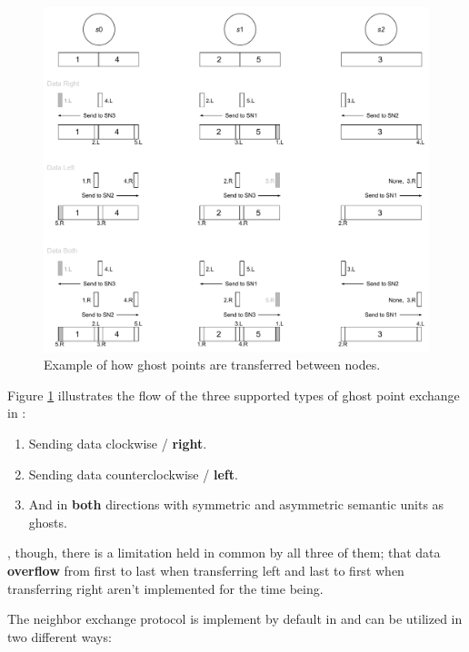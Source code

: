\begin{figure}[ht!]
\centering
\vspace*{6mm}
\includegraphics[scale=0.55]{pdf/ghost-transfer.pdf}
\vspace*{4mm}
\caption[Ghost transfer example]{Example of how ghost points are transferred between nodes.}
\vspace*{6mm}
\label{fig:ghost-transfer}
\end{figure}

Figure \ref{fig:ghost-transfer} illustrates the flow of the three supported types of ghost point exchange in \CodeName:

\begin{enumerate}
	\item Sending data clockwise / \textbf{right}.
	\item Sending data counterclockwise / \textbf{left}.
	\item And in \textbf{both} directions with symmetric and asymmetric semantic units as ghosts.
\end{enumerate}
\vspace*{2mm}
, though, there is a limitation held in common by all three of them; that data \textbf{overflow} from first to last when transferring left and last to first when transferring right aren't implemented for the time being.
\newline

The neighbor exchange protocol is implement by default in \CodeName and can be utilized in two different ways:

